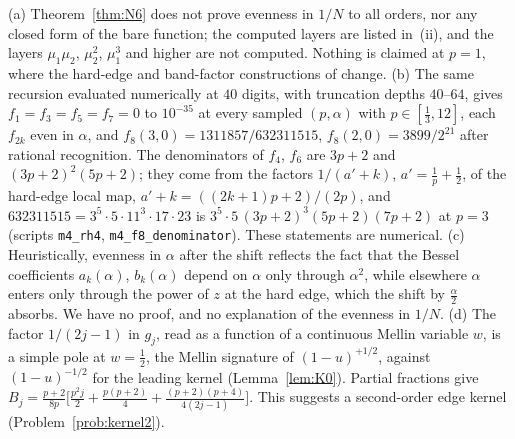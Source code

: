 \begin{remark}\label{rem:N6}
(a) Theorem~\ref{thm:N6} does not prove evenness in $1/N$ to all orders, nor any closed form of the bare function; the
computed layers are listed in~(ii), and the layers $\mu_1\mu_2$, $\mu_2^2$, $\mu_1^3$ and higher are not computed. Nothing
is claimed at $p=1$, where the hard-edge and band-factor constructions of \cite{PaperII} change.
(b) The same recursion evaluated numerically at $40$ digits, with truncation depths $40$--$64$, gives $f_1=f_3=f_5=f_7=0$ to
$10^{-35}$ at every sampled $(p,\alpha)$ with $p\in[\frac13,12]$, each $f_{2k}$ even in $\alpha$, and
$f_8(3,0)=1311857/632311515$, $f_8(2,0)=3899/2^{21}$ after rational recognition. The denominators of $f_4$, $f_6$ are
$3p+2$ and $(3p+2)^2(5p+2)$; they come from the factors $1/(a'+k)$, $a'=\frac1p+\frac12$, of the hard-edge local map,
$a'+k=((2k+1)p+2)/(2p)$, and $632311515=3^5\cdot5\cdot11^3\cdot17\cdot23$ is $3^5\cdot5\,(3p+2)^3(5p+2)(7p+2)$ at $p=3$
(scripts \texttt{m4\_rh4}, \texttt{m4\_f8\_denominator}). These statements are numerical.
(c) Heuristically, evenness in $\alpha$ after the shift reflects the fact that the Bessel coefficients $a_k(\alpha)$,
$b_k(\alpha)$ depend on $\alpha$ only through $\alpha^2$, while elsewhere $\alpha$ enters only through the power of $z$ at the
hard edge, which the shift by $\frac\alpha2$ absorbs. We have no proof, and no explanation of the evenness in $1/N$.
(d) The factor $1/(2j-1)$ in $g_j$, read as a function of a continuous Mellin variable $w$, is a simple pole at
$w=\frac12$, the Mellin signature of $(1-u)^{+1/2}$, against $(1-u)^{-1/2}$ for the leading kernel
(Lemma~\ref{lem:K0}). Partial fractions give
$B_j=\frac{p+2}{8p}\bigl[\frac{p^2j}2+\frac{p(p+2)}4+\frac{(p+2)(p+4)}{4(2j-1)}\bigr]$. This suggests a second-order edge kernel
(Problem~\ref{prob:kernel2}).
\end{remark}
